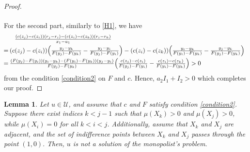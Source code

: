 \documentclass[12pt,reqno]{amsart}
\newtheorem{lem}{Lemma}
\begin{document}
\begin{proof}
\[\begin{array}{ll}
\end{array}\]

For the second part, similarly to \ref{H1}, we have 
\[\hspace{-6pt}\begin{array}{ll}

&\frac{(c(z_j)-c(z_i))(r_j-r_i)-(c(z_i)-c(z_k))(r_i-r_k)}{x_1-a_1}\vspace{3pt}\\
=&\hspace{-8pt}(c(z_j)-c(z_i))\Big(\frac{y_j-y_k}{F(y_j)-F(y_k)}-\frac{y_j-y_i}{F(y_j)-F(y_i)}\Big)-(c(z_i)-c(z_k))\Big(\frac{y_i-y_k}{F(y_i)-F(y_k)}-\frac{y_j-y_k}{F(y_j)-F(y_k)}\Big)\vspace{3pt}\\
=&\hspace{-8pt}\frac{(F(y_j)-F(y_i))(y_i-y_k)-(F(y_i)-F(y_k))(y_j-y_i)}{F(y_j)-F(y_k)}\Big(\frac{c(z_j)-c(z_i)}{F(y_j)-F(y_i)}-\frac{c(z_i)-c(z_k)}{F(y_i)-F(y_k)}\Big)>0
\end{array}\]
from the condition \ref{condition2} on $F$ and $c.$ Hence, $a_2I_1+I_2>0$ which completes our proof.
\end{proof}



\begin{lem}\label{between3}
     Let $ u \in \mathcal{U} $, and assume that $ c $ and $ F $ satisfy condition \ref{condition2}. Suppose there exist indices $ k < j - 1 $ such that $ \mu(X_k) > 0 $ and $ \mu(X_j) > 0 $, while $ \mu(X_i) = 0 $ for all $ k < i < j $. Additionally, assume that $ X_k $ and $ X_j $ are adjacent, and the set of indifference points between $ X_k $ and $ X_j $  passes through the point $(1,0).$ Then, $u$ is not a solution of the monopolist's problem. 
\end{lem}
\end{document}
